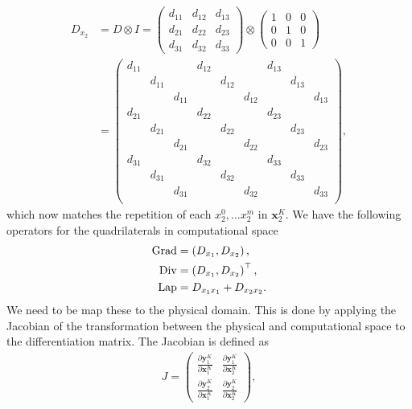 \begin{align*}
	D_{x_2}&=D \otimes I = 
	\begin{pmatrix}
		d_{11} & d_{12} & d_{13}\\
		d_{21} & d_{22} & d_{23} \\
		d_{31} & d_{32} & d_{33}
	\end{pmatrix}
	\otimes
	\begin{pmatrix}
		1 & 0 & 0\\
		0 & 1 & 0 \\
		0 & 0 & 1
	\end{pmatrix}
	\\&=
	\begin{pmatrix}
		d_{11} & & & d_{12} & & & d_{13} & & \\
		& d_{11} & & & d_{12} & & &  d_{13} & \\
		& & d_{11} & & &  d_{12} &  & & d_{13}\\
		d_{21} & & & d_{22} & & & d_{23} & & \\
		& d_{21} & & & d_{22} & & &  d_{23} & \\
		& & d_{21} & & &  d_{22} &  & & d_{23}\\
		d_{31} & & & d_{32} & & & d_{33} & & \\
		& d_{31} & & & d_{32} & & &  d_{33} & \\
		& & d_{31} & & &  d_{32} &  & & d_{33}\\
	\end{pmatrix},
\end{align*}
which now matches the repetition of each $x_2^0,...x_2^m$ in $\mathbf{x}_2^{K}$.
We have the following operators for the quadrilaterals in computational space
\begin{align*}
	\operatorname{Grad} &= \left(D_{x_1}, D_{x_2}\right),\\
	\operatorname{Div} &=\left(D_{x_1}, D_{x_2}\right)^\top,\\
	\operatorname{Lap} &= D_{x_1x_1} + D_{x_2x_2}.
\end{align*}
We need to be map these to the physical domain. This is done by applying the Jacobian of the transformation between the physical and computational space to the differentiation matrix.
The Jacobian is defined as
\begin{align*}
	J = \begin{pmatrix}
		\frac{\partial \mathbf{y}_1^{K}}{\partial \mathbf{x}_1^{K}} & \frac{\partial \mathbf{y}_1^{K}}{\partial \mathbf{x}_2^{K}}\\
		\frac{\partial \mathbf{y}_2^{K}}{\partial \mathbf{x}_1^{K}} & \frac{\partial \mathbf{y}_2^{K}}{\partial \mathbf{x}_2^{K}}
	\end{pmatrix},
\end{align*}
